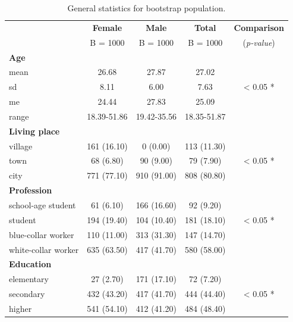 \documentclass[12pt,a4paper,notitlepage]{report}
\begin{document}
\begin{table}[H]
\centering
	\begin{tabular}{lcccc}
	\hline 		 			& \textbf{Female} & \textbf{Male} 	& \textbf{Total} &  \textbf{Comparison} \\
	 		 				& B = 1000 		& B = 1000	& B = 1000	&  (\textit{p-value}) \\
	\hline
	\hline
	\bf{Age}					&			&			&				&		\\
	\indent mean				& 26.68		& 27.87		& 27.02			& 		\\
	\indent sd				& 8.11		& 6.00		& 7.63			& < 0.05 * \\
	\indent me				& 24.44		& 27.83		& 25.09			& 		\\
	\indent range			& 18.39-51.86 	& 19.42-35.56	& 18.35-51.87 		&	 	\\
	\hline
	
	\bf{Living place} 			&				&				&				&		\\
	\indent village			& 161 (16.10)	& 0 (0.00)		& 113 (11.30)	& 		\\
	\indent town				& 68 (6.80)		& 90 (9.00) 		& 79 (7.90) 		&  < 0.05 *\\
	\indent city				& 771 (77.10)	& 910 (91.00) 	& 808 (80.80) 	& 		\\
	\hline
	
	\bf{Profession} 			&			&			&				&		\\
	\indent school-age student	& 61 (6.10)	& 166 (16.60)	& 92 (9.20) 		& 		\\
	\indent student				& 194 (19.40)	& 104 (10.40) 	& 181 (18.10) 		& < 0.05 *\\
	\indent blue-collar worker		& 110 (11.00)	& 313 (31.30) 	& 147 (14.70) 		& 		\\
	\indent white-collar worker	& 635 (63.50)	& 417 (41.70) 	& 580 (58.00) 		& 		\\
	\hline
	
	\bf{Education} 				&			&			&				&		\\
	\indent elementary			& 27 (2.70)	& 171 (17.10)	& 72 (7.20) 		& 		\\
	\indent secondary			& 432 (43.20)	& 417 (41.70) 	& 444 (44.40) 		& < 0.05 *\\
	\indent higher				& 541 (54.10)	& 412 (41.20) 	& 484 (48.40) 		& 		\\
	\hline
	
	\end{tabular} \\ 
	\caption{General statistics for bootstrap population.}
	\label{tab:General_stats_boot}
\end{table}
\end{document}
